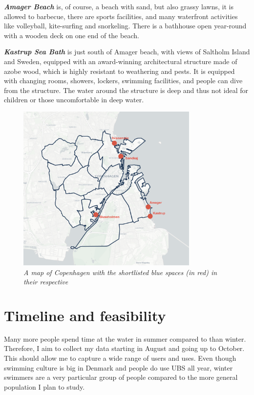 \documentclass{article}
\newcommand{\bisection}[1]{\textbf{\textit{#1}}}
\begin{document}
\bisection{Amager Beach} is, of course, a beach with sand, but also grassy lawns, it is allowed to barbecue, there are sports facilities, and many waterfront activities like volleyball, kite-surfing and snorkeling. There is a bathhouse open year-round with a wooden deck on one end of the beach.

\bisection{Kastrup Sea Bath} is just south of Amager beach, with views of Saltholm Island and Sweden, equipped with an award-winning architectural structure made of azobe wood, which is highly resistant to weathering and pests. It is equipped with changing rooms, showers, lockers, swimming facilities, and people can dive from the structure. The water around the structure is deep and thus not ideal for children or those uncomfortable in deep water.

\begin{figure}[htp]
	\centering
	\includegraphics[width=0.8\textwidth]{copenhagen_bs_shortlist.png}
	\caption{\textit{A map of Copenhagen with the shortlisted blue spaces (in red) in their respective}}
	  \label{fig:ubs}
\end{figure}

\pagebreak
\section{Timeline and feasibility}

Many more people spend time at the water in summer compared to than winter. Therefore, I aim to collect my data starting in August and going up to October. This should allow me to capture a wide range of users and uses. Even though swimming culture is big in Denmark and people do use UBS all year, winter swimmers are a very particular group of people compared to the more general population I plan to study.
\end{document}
